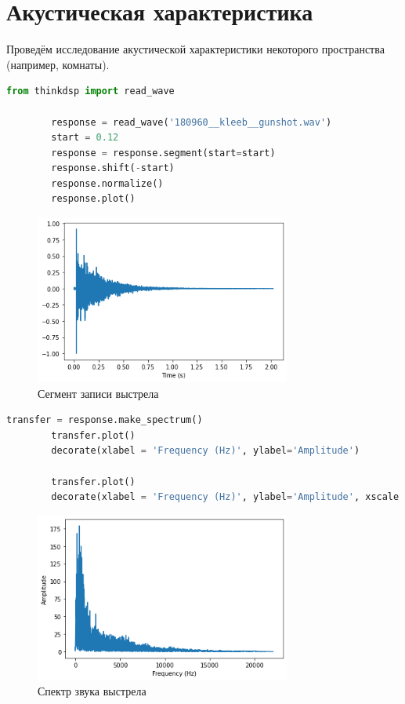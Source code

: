 \documentclass[a4paper, 12pt]{report}
\begin{document}
	\chapter{Акустическая характеристика}
	Проведём исследование акустической характеристики некоторого пространства (например, комнаты).
	\begin{lstlisting}[language=Python,caption=Звук выстрела]
		from thinkdsp import read_wave

		response = read_wave('180960__kleeb__gunshot.wav')
		start = 0.12
		response = response.segment(start=start)
		response.shift(-start)
		response.normalize()
		response.plot()
	\end{lstlisting}
	\begin{figure}[H]
		\centering
		\includegraphics[width=0.75\textwidth]{shot1.png}
		\caption{Сегмент записи выстрела}
		\label{fig:shot1}
	\end{figure}
	\begin{lstlisting}[language=Python,caption=Строим спектр звука выстрела]
		transfer = response.make_spectrum()
		transfer.plot()
		decorate(xlabel = 'Frequency (Hz)', ylabel='Amplitude')
		
		transfer.plot()
		decorate(xlabel = 'Frequency (Hz)', ylabel='Amplitude', xscale = 'log', yscale = 'log')
	\end{lstlisting}
	\begin{figure}[H]
		\centering
		\includegraphics[width=0.75\textwidth]{shot2.png}
		\caption{Спектр звука выстрела}
		\label{fig:shot2}
	\end{figure}
\end{document}
